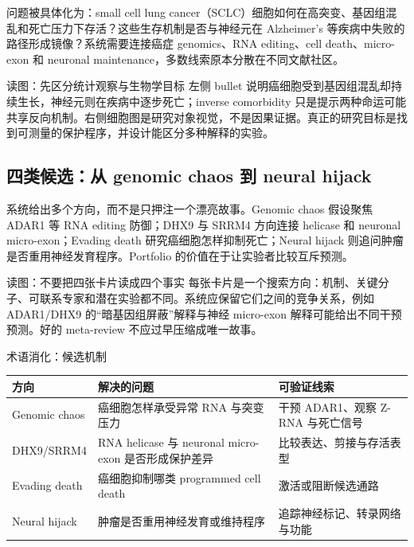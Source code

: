 问题被具体化为：small cell lung cancer（SCLC）细胞如何在高突变、基因组混乱和死亡压力下存活？这些生存机制是否与神经元在 Alzheimer’s 等疾病中失败的路径形成镜像？系统需要连接癌症 genomics、RNA editing、cell death、micro-exon 和 neuronal maintenance，多数线索原本分散在不同文献社区。


\begin{knowledgebox}{读图：先区分统计观察与生物学目标}
左侧 bullet 说明癌细胞受到基因组混乱却持续生长，神经元则在疾病中逐步死亡；inverse comorbidity 只是提示两种命运可能共享反向机制。右侧细胞图是研究对象视觉，不是因果证据。真正的研究目标是找到可测量的保护程序，并设计能区分多种解释的实验。
\end{knowledgebox}

\subsection{四类候选：从 genomic chaos 到 neural hijack}

系统给出多个方向，而不是只押注一个漂亮故事。Genomic chaos 假设聚焦 ADAR1 等 RNA editing 防御；DHX9 与 SRRM4 方向连接 helicase 和 neuronal micro-exon；Evading death 研究癌细胞怎样抑制死亡；Neural hijack 则追问肿瘤是否重用神经发育程序。Portfolio 的价值在于让实验者比较互斥预测。


\begin{knowledgebox}{读图：不要把四张卡片读成四个事实}
每张卡片是一个搜索方向：机制、关键分子、可联系专家和潜在实验都不同。系统应保留它们之间的竞争关系，例如 ADAR1/DHX9 的“暗基因组屏蔽”解释与神经 micro-exon 解释可能给出不同干预预测。好的 meta-review 不应过早压缩成唯一故事。
\end{knowledgebox}

\begin{knowledgebox}{术语消化：候选机制}
\begin{tabularx}{\textwidth}{L{0.22\textwidth}X X}
\toprule
方向 & 解决的问题 & 可验证线索 \\
\midrule
Genomic chaos & 癌细胞怎样承受异常 RNA 与突变压力 & 干预 ADAR1、观察 Z-RNA 与死亡信号 \\
DHX9/SRRM4 & RNA helicase 与 neuronal micro-exon 是否形成保护差异 & 比较表达、剪接与存活表型 \\
Evading death & 癌细胞抑制哪类 programmed cell death & 激活或阻断候选通路 \\
Neural hijack & 肿瘤是否重用神经发育或维持程序 & 追踪神经标记、转录网络与功能 \\
\bottomrule
\end{tabularx}
\end{knowledgebox}

